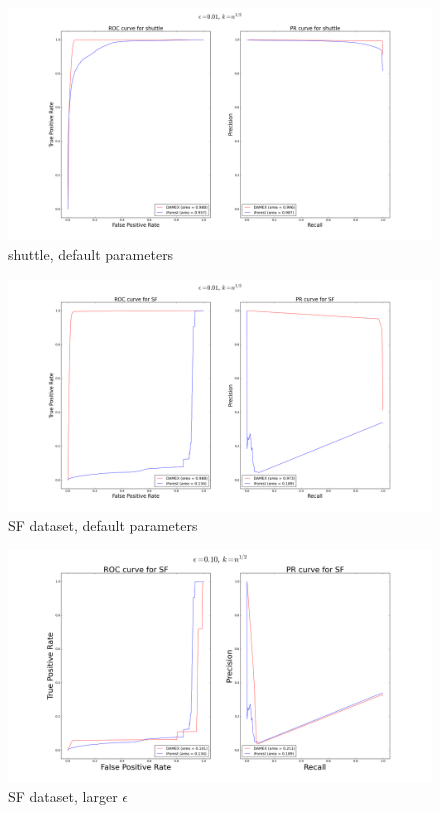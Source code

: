 \begin{figure}[!ht]
  \centering
  \includegraphics[width = \textwidth]{fig_source/shuttle-semi-supervised-average-rect-01.png}
  \caption{shuttle, default parameters}
\label{jmva:fig:shuttle}
\end{figure}
\begin{figure}[!ht]
  \centering
  \includegraphics[width = \textwidth]{fig_source/SF-4d-lb-semi-supervised-average-rect-01}
  \caption{SF dataset, default parameters}
\label{jmva:fig:SF}
\end{figure}
\begin{figure}[!ht]
  \centering
  \includegraphics[width = \textwidth]{fig_source/SF-4d-lb-semi-supervised-average-rect-1}
  \caption{SF dataset, larger $\epsilon$}
\label{jmva:fig:SF_1}
\end{figure}

